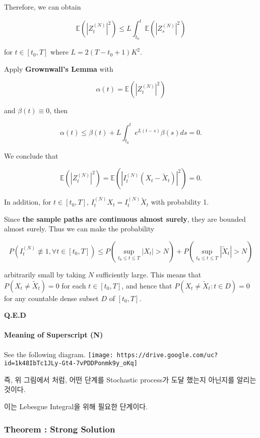 \documentclass[]{article}
\let\oldparagraph\paragraph
\renewcommand{\paragraph}[1]{\oldparagraph{#1}\mbox{}}
\begin{document}
Therefore, we can obtain

\[\mathbb{E} \left( \left| Z_t^{(N)} \right|^2 \right) \leq L \int_{t_0}^t \mathbb{E} \left( \left| Z_s^{(N)}  \right|^2 \right)
\label{eq02:pf_lemma}
\tag{6}\]

for \( t \in [t_0, T]\) where \(L = 2(T - t_0 + 1)K^2 \).

Apply \textbf{Grownwall's Lemma} with

\[\alpha(t) = \mathbb{E}\left( \left| Z_t^{(N)} \right|^2 \right)\]

and \(\beta(t) \equiv 0\), then

\[\alpha(t) \leq \beta(t) + L \int_{t_0}^t e^{L(t-s)}\beta(s) ds
= 0.
\tag{7}\]

We conclude that

\[\mathbb{E} \left( \left| Z_t^{(N)} \right|^2 \right) 
= \mathbb{E} \left( \left| I_t^{(N)} (X_t - \tilde{X}_t) \right|^2 \right) = 0.
\tag{8}\]

In addition, for \(t \in [t_0, T]\),
\(I_t^{(N)} X_t = I_t^{(N)} \tilde{X}_t\) with probability 1.

Since \textbf{the sample paths are continuous almost surely}, they are
bounded almost surely. Thus we can make the probability

\[P \left( I_t^{(N)} \not\equiv 1, \forall t \in [t_0, T] \right) \leq P \left( \sup_{t_0 \leq t \leq T} |X_t| > N \right) + P \left( \sup_{t_0 \leq t \leq T} |\tilde{X}_t| > N \right)
\tag{9}\]

arbitrarily small by taking \(N\) sufficiently large. This means that
\(P \left( X_t \neq \tilde{X}_t \right) = 0\) for each
\(t \in [t_0, T] \), and hence that
\(P \left( X_t \neq \tilde{X}_t : t \in D \right) = 0\) for any
countable dense subset \(D\) of \([t_0, T]\).

\textbf{Q.E.D}

\hypertarget{header-n35}{%
\paragraph{Meaning of Superscript (N)}\label{header-n35}}

See the following diagram.
\texttt{[image: https://drive.google.com/uc?id=1k48IbTc1JLy-Gt4-7vPDDPonmk9y\_oKq]}

즉, 위 그림에서 처럼, 어떤 단계를 Stochastic process가 도달 했는지
아닌지를 알리는 것이다.

이는 Lebesgue Integral을 위해 필요한 단계이다.

\hypertarget{header-n41}{%
\subsubsection{Theorem : Strong Solution}\label{header-n41}}
\end{document}

